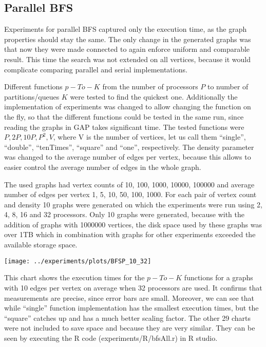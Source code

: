 \documentclass{report}
\theoremstyle{plain}
\theoremstyle{definition}
\theoremstyle{remark}
\begin{document}
\subsection{Parallel BFS}

Experiments for parallel BFS captured only the execution time, as the graph properties should stay the same. The only change in the generated graphs was that now they were made connected to again enforce uniform and comparable result. This time the search was not extended on all vertices, because it would complicate comparing parallel and serial implementations. 

Different functions $p-To-K$ from the number of processors $P$ to number of partitions/queues $K$ were tested to find the quickest one. Additionally the implementation of experiments was changed to allow changing the function on the fly, so that the different functions could be tested in the same run, since reading the graphs in GAP takes significant time. The tested functions were $P, 2P, 10P, P^2, V$, where V is the number of vertices, let us call them ``single'', ``double'', ``tenTimes'', ``square'' and ``one'', respectively. The density parameter was changed to the average number of edges per vertex, because this allows to easier control the average number of edges in the whole graph.

The used graphs had vertex counts of 10, 100, 1000, 10000, 100000 and average number of edges per vertex 1, 5, 10, 50, 100, 1000. For each pair of vertex count and density 10 graphs were generated on which the experiments were run using 2, 4, 8, 16 and 32 processors. Only 10 graphs were generated, because with the addition of graphs with 1000000 vertices, the disk space used by these graphs was over 1TB which in combination with graphs for other experiments exceeded the available storage space.

\texttt{[image: ../experiments/plots/BFSP\_10\_32]}

This chart shows the execution times for the $p-To-K$ functions for a graphs with 10 edges per vertex on average when 32 processors are used. It confirms that measurements are precise, since error bars are small. Moreover, we can see that while ``single'' function implementation has the smallest execution times, but the ``square'' catches up and has a much better scaling factor. The other 29 charts were not included to save space and because they are very similar. They can be seen by executing the R code (experiments/R/bfsAll.r) in R studio.
\end{document}

